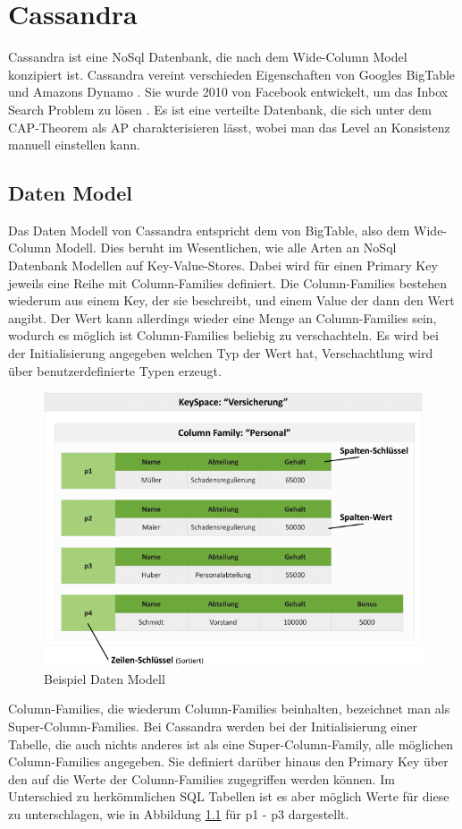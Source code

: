 \chapter{Cassandra}
\label{appendix:Cassandra}
Cassandra ist eine NoSql Datenbank, die nach dem Wide-Column Model konzipiert ist. Cassandra vereint verschieden Eigenschaften von Googles BigTable \cite{bigtable} und Amazons Dynamo \cite{dynamo}. Sie wurde 2010 von Facebook entwickelt, um das Inbox Search Problem zu lösen \cite{cassandra}. Es ist eine verteilte Datenbank, die sich unter dem CAP-Theorem als AP charakterisieren lässt, wobei man das Level an Konsistenz manuell einstellen kann.

\section{Daten Model}
\label{sec:DM}
Das Daten Modell von Cassandra entspricht dem von BigTable, also dem Wide-Column Modell. Dies beruht im Wesentlichen, wie alle Arten an NoSql Datenbank Modellen auf Key-Value-Stores. Dabei wird für einen Primary Key jeweils eine Reihe mit Column-Families definiert. Die Column-Families bestehen wiederum aus einem Key, der sie beschreibt, und einem Value der dann den Wert angibt. Der Wert kann allerdings wieder eine Menge an Column-Families sein, wodurch es möglich ist Column-Families beliebig zu verschachteln. Es wird bei der Initialisierung angegeben welchen Typ der Wert hat, Verschachtlung wird über benutzerdefinierte Typen erzeugt.
\begin{figure}[htbp!]
	\centering
	\includegraphics[scale=0.45]{pics/colfam.png}
	\caption{Beispiel Daten Modell}
	\label{fig:bspDM}

\end{figure} Column-Families, die wiederum Column-Families beinhalten, bezeichnet man als Super-Column-Families. Bei Cassandra werden bei der Initialisierung einer Tabelle, die auch nichts anderes ist als eine Super-Column-Family, alle möglichen Column-Families angegeben. Sie definiert darüber hinaus den Primary Key über den auf die Werte der Column-Families zugegriffen werden können. Im Unterschied zu herkömmlichen SQL Tabellen ist es aber möglich Werte für diese zu unterschlagen, wie in Abbildung \ref{fig:bspDM} für p1 - p3 dargestellt.\\ 
